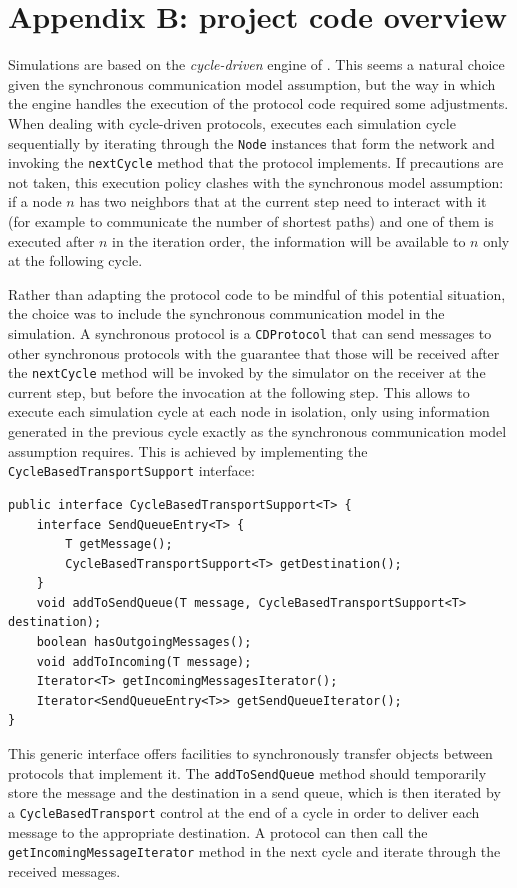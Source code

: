 
\section*{Appendix B: project code overview}

Simulations are based on the \emph{cycle-driven} engine of \peersim{}. This seems a natural choice given the synchronous communication model assumption, but the way in which the engine handles the execution of the protocol code required some adjustments. When dealing with cycle-driven protocols, \peersim{} executes each simulation cycle sequentially by iterating through the \texttt{Node} instances that form the network and invoking the \texttt{nextCycle} method that the protocol implements. If precautions are not taken, this execution policy clashes with the synchronous model assumption: if a node $n$ has two neighbors that at the current step need to interact with it (for example to communicate the number of shortest paths) and one of them is executed after $n$ in the iteration order, the information will be available to $n$ only at the following cycle.

Rather than adapting the protocol code to be mindful of this potential situation, the choice was to include the synchronous communication model in the simulation. A synchronous protocol is a \texttt{CDProtocol} that can send messages to other synchronous protocols with the guarantee that those will be received after the \texttt{nextCycle} method will be invoked by the simulator on the receiver at the current step, but before the invocation at the following step. This allows to execute each simulation cycle at each node in isolation, only using information generated in the previous cycle exactly as the synchronous communication model assumption requires. This is achieved by implementing the \texttt{CycleBasedTransportSupport} interface:
\begin{verbatim}
public interface CycleBasedTransportSupport<T> {
    interface SendQueueEntry<T> {
        T getMessage();
        CycleBasedTransportSupport<T> getDestination();
    }
    void addToSendQueue(T message, CycleBasedTransportSupport<T> destination);
    boolean hasOutgoingMessages();
    void addToIncoming(T message);
    Iterator<T> getIncomingMessagesIterator();
    Iterator<SendQueueEntry<T>> getSendQueueIterator();
}
\end{verbatim}
This generic interface offers facilities to synchronously transfer objects between protocols that implement it. The \texttt{addToSendQueue} method should temporarily store the message and the destination in a send queue, which is then iterated by a \texttt{CycleBasedTransport} control at the end of a cycle in order to deliver each message to the appropriate destination. A protocol can then call the \texttt{getIncomingMessageIterator} method in the next cycle and iterate through the received messages.

